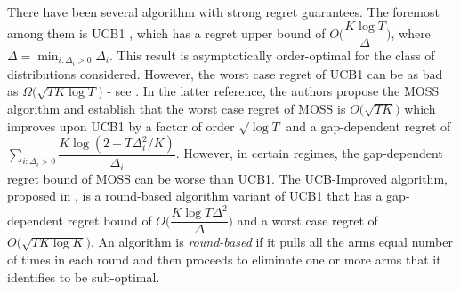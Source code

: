 	There have been several algorithm with strong regret guarantees. The foremost among them is UCB1 \cite{auer2002finite}, which has a regret upper bound of $O\bigg(\dfrac{K\log T}{\Delta}\bigg)$, where $\Delta = \min_{i:\Delta_i>0} \Delta_i$. This result is asymptotically order-optimal for the class of distributions considered. However, the worst case regret of UCB1  can be as bad as $\Omega \bigg(\sqrt{TK\log T}\bigg)$ - see \cite{audibert2009minimax}.  In the latter reference, the authors propose the MOSS algorithm and establish that the worst case regret of MOSS is $O\bigg(\sqrt{TK}\bigg)$ which improves upon UCB1 by a factor of order $\sqrt{\log T}$ and a gap-dependent regret of $\sum_{i:\Delta_{i}>0}\dfrac{K\log(2+T\Delta_{i}^{2}/K)}{\Delta_{i}}$. However, in certain regimes, the gap-dependent regret bound of MOSS can be worse than UCB1. The UCB-Improved algorithm, proposed in \cite{auer2010ucb}, is a round-based algorithm variant of UCB1 that 
has a gap-dependent regret bound of $O\bigg(\dfrac{K\log T\Delta^{2}}{\Delta}\bigg)$ and a worst case regret of $O\bigg(\sqrt{TK\log K}\bigg)$. An algorithm is \textit{round-based} if it pulls all the arms equal number of times in each round and then proceeds to eliminate one or more arms that it identifies to be sub-optimal. 
	

